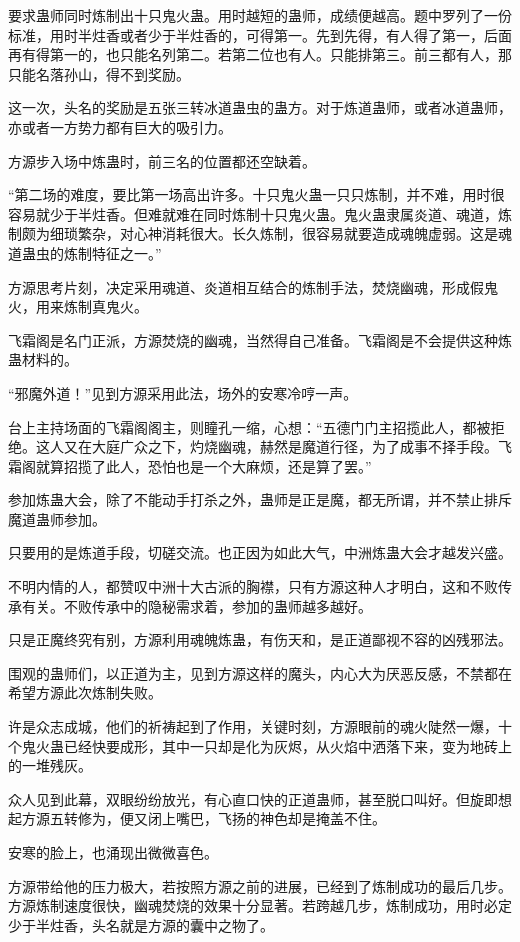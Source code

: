 \begin{this_body}
要求蛊师同时炼制出十只鬼火蛊。用时越短的蛊师，成绩便越高。题中罗列了一份标准，用时半炷香或者少于半炷香的，可得第一。先到先得，有人得了第一，后面再有得第一的，也只能名列第二。若第二位也有人。只能排第三。前三都有人，那只能名落孙山，得不到奖励。

这一次，头名的奖励是五张三转冰道蛊虫的蛊方。对于炼道蛊师，或者冰道蛊师，亦或者一方势力都有巨大的吸引力。

方源步入场中炼蛊时，前三名的位置都还空缺着。

“第二场的难度，要比第一场高出许多。十只鬼火蛊一只只炼制，并不难，用时很容易就少于半炷香。但难就难在同时炼制十只鬼火蛊。鬼火蛊隶属炎道、魂道，炼制颇为细琐繁杂，对心神消耗很大。长久炼制，很容易就要造成魂魄虚弱。这是魂道蛊虫的炼制特征之一。”

方源思考片刻，决定采用魂道、炎道相互结合的炼制手法，焚烧幽魂，形成假鬼火，用来炼制真鬼火。

飞霜阁是名门正派，方源焚烧的幽魂，当然得自己准备。飞霜阁是不会提供这种炼蛊材料的。

“邪魔外道！”见到方源采用此法，场外的安寒冷哼一声。

台上主持场面的飞霜阁阁主，则瞳孔一缩，心想：“五德门门主招揽此人，都被拒绝。这人又在大庭广众之下，灼烧幽魂，赫然是魔道行径，为了成事不择手段。飞霜阁就算招揽了此人，恐怕也是一个大麻烦，还是算了罢。”

参加炼蛊大会，除了不能动手打杀之外，蛊师是正是魔，都无所谓，并不禁止排斥魔道蛊师参加。

只要用的是炼道手段，切磋交流。也正因为如此大气，中洲炼蛊大会才越发兴盛。

不明内情的人，都赞叹中洲十大古派的胸襟，只有方源这种人才明白，这和不败传承有关。不败传承中的隐秘需求着，参加的蛊师越多越好。

只是正魔终究有别，方源利用魂魄炼蛊，有伤天和，是正道鄙视不容的凶残邪法。

围观的蛊师们，以正道为主，见到方源这样的魔头，内心大为厌恶反感，不禁都在希望方源此次炼制失败。

许是众志成城，他们的祈祷起到了作用，关键时刻，方源眼前的魂火陡然一爆，十个鬼火蛊已经快要成形，其中一只却是化为灰烬，从火焰中洒落下来，变为地砖上的一堆残灰。

众人见到此幕，双眼纷纷放光，有心直口快的正道蛊师，甚至脱口叫好。但旋即想起方源五转修为，便又闭上嘴巴，飞扬的神色却是掩盖不住。

安寒的脸上，也涌现出微微喜色。

方源带给他的压力极大，若按照方源之前的进展，已经到了炼制成功的最后几步。方源炼制速度很快，幽魂焚烧的效果十分显著。若跨越几步，炼制成功，用时必定少于半炷香，头名就是方源的囊中之物了。


\end{this_body}
